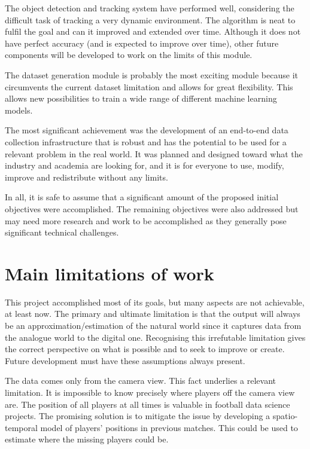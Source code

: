 \documentclass[
    11pt,
    oneside
]{report}
\begin{document}
The object detection and tracking system have performed well, considering the difficult task of tracking a very dynamic environment. The algorithm is neat to fulfil the goal and can it improved and extended over time. Although it does not have perfect accuracy (and is expected to improve over time), other future components will be developed to work on the limits of this module.


The dataset generation module is probably the most exciting module because it circumvents the current dataset limitation and allows for great flexibility. This allows new possibilities to train a wide range of different machine learning models.


The most significant achievement was the development of an end-to-end data collection infrastructure that is robust and has the potential to be used for a relevant problem in the real world. It was planned and designed toward what the industry and academia are looking for, and it is for everyone to use, modify, improve and redistribute without any limits.


In all, it is safe to assume that a significant amount of the proposed initial objectives were accomplished. The remaining objectives were also addressed but may need more research and work to be accomplished as they generally pose significant technical challenges.


\section{Main limitations of work}


This project accomplished most of its goals, but many aspects are not achievable, at least now. The primary and ultimate limitation is that the output will always be an approximation/estimation of the natural world since it captures data from the analogue world to the digital one. Recognising this irrefutable limitation gives the correct perspective on what is possible and to seek to improve or create. Future development must have these assumptions always present.


The data comes only from the camera view. This fact underlies a relevant limitation. It is impossible to know precisely where players off the camera view are. The position of all players at all times is valuable in football data science projects. The promising solution is to mitigate the issue by developing a spatio-temporal model of players' positions in previous matches. This could be used to estimate where the missing players could be.
\end{document}
